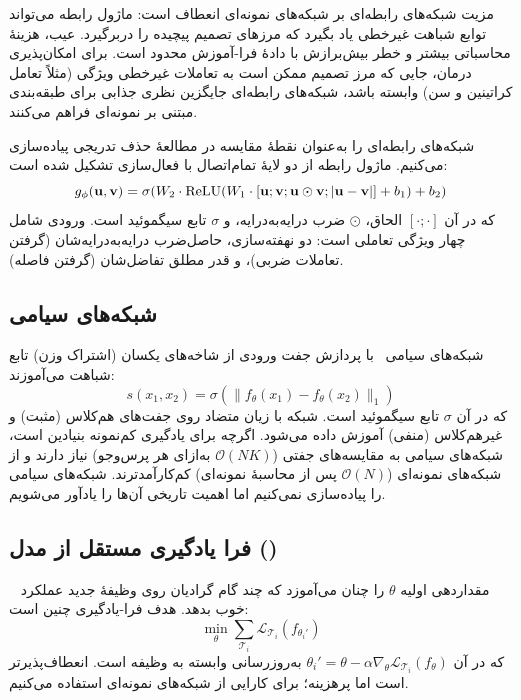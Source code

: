 مزیت شبکه‌های رابطه‌ای بر شبکه‌های نمونه‌ای انعطاف است: ماژول رابطه می‌تواند توابع شباهت غیرخطی یاد بگیرد که مرزهای تصمیم پیچیده را دربرگیرد. عیب، هزینۀ محاسباتی بیشتر و خطر بیش‌برازش با دادۀ فرا-آموزش محدود است. برای امکان‌پذیری درمان، جایی که مرز تصمیم ممکن است به تعاملات غیرخطی ویژگی (مثلاً تعامل کراتینین و سن) وابسته باشد، شبکه‌های رابطه‌ای جایگزین نظری جذابی برای طبقه‌بندی مبتنی بر نمونه‌ای فراهم می‌کنند.

شبکه‌های رابطه‌ای را به‌عنوان نقطۀ مقایسه در مطالعۀ حذف تدریجی پیاده‌سازی می‌کنیم. ماژول رابطه از دو لایۀ تمام‌اتصال با فعال‌سازی  تشکیل شده است:
\begin{equation}
g_\phi(\mathbf{u}, \mathbf{v}) = \sigma(W_2 \cdot \text{ReLU}(W_1 \cdot [\mathbf{u}; \mathbf{v}; \mathbf{u} \odot \mathbf{v}; |\mathbf{u} - \mathbf{v}|] + b_1) + b_2)
\end{equation}
که در آن $[\cdot;\cdot]$ الحاق، $\odot$ ضرب درایه‌به‌درایه، و $\sigma$ تابع سیگموئید است. ورودی شامل چهار ویژگی تعاملی است: دو نهفته‌سازی، حاصل‌ضرب درایه‌به‌درایه‌شان (گرفتن تعاملات ضربی)، و قدر مطلق تفاضل‌شان (گرفتن فاصله).

\subsection{شبکه‌های سیامی}

شبکه‌های سیامی~\cite{koch2015siamese} با پردازش جفت ورودی از شاخه‌های یکسان (اشتراک وزن) تابع شباهت می‌آموزند:
\begin{equation}
s(x_1, x_2) = \sigma(\|f_\theta(x_1) - f_\theta(x_2)\|_1)
\end{equation}
که در آن $\sigma$ تابع سیگموئید است. شبکه با زیان متضاد روی جفت‌های هم‌کلاس (مثبت) و غیرهم‌کلاس (منفی) آموزش داده می‌شود. اگرچه برای یادگیری کم‌نمونه بنیادین است، شبکه‌های سیامی به مقایسه‌های جفتی ($\mathcal{O}(NK)$ به‌ازای هر پرس‌وجو) نیاز دارند و از شبکه‌های نمونه‌ای ($\mathcal{O}(N)$ پس از محاسبۀ نمونه‌ای) کم‌کارآمدترند. شبکه‌های سیامی را پیاده‌سازی نمی‌کنیم اما اهمیت تاریخی آن‌ها را یادآور می‌شویم.

\subsection{فرا یادگیری مستقل از مدل ()}

~\cite{finn2017model} مقداردهی اولیه $\theta$ را چنان می‌آموزد که چند گام گرادیان روی وظیفۀ جدید عملکرد خوب بدهد. هدف فرا-یادگیری چنین است:
\begin{equation}
\min_\theta \sum_{\mathcal{T}_i} \mathcal{L}_{\mathcal{T}_i}(f_{\theta_i'})
\end{equation}
که در آن $\theta_i' = \theta - \alpha \nabla_\theta \mathcal{L}_{\mathcal{T}_i}(f_\theta)$ به‌روزرسانی وابسته به وظیفه است.  انعطاف‌پذیرتر است اما پرهزینه؛ برای کارایی از شبکه‌های نمونه‌ای استفاده می‌کنیم.

